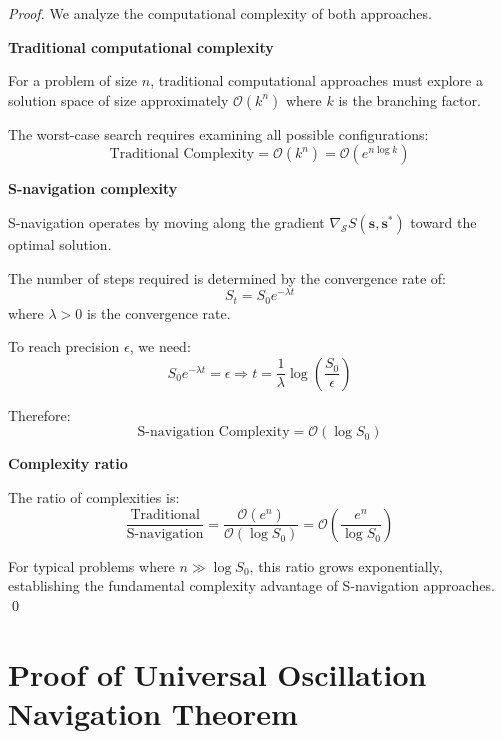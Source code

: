 \documentclass[12pt,a4paper]{article}
\begin{document}
\begin{proof}
We analyze the computational complexity of both approaches.

\textbf{Traditional computational complexity}

For a problem of size $n$, traditional computational approaches must explore a solution space of size approximately $\mathcal{O}(k^n)$ where $k$ is the branching factor.

The worst-case search requires examining all possible configurations:
\begin{equation}
\text{Traditional Complexity} = \mathcal{O}(k^n) = \mathcal{O}(e^{n \log k})
\end{equation}

\textbf{S-navigation complexity}

S-navigation operates by moving along the gradient $\nabla_{\mathcal{S}} S(\mathbf{s}, \mathbf{s}^*)$ toward the optimal solution.

The number of steps required is determined by the convergence rate of:
\begin{equation}
S_t = S_0 e^{-\lambda t}
\end{equation}
where $\lambda > 0$ is the convergence rate.

To reach precision $\epsilon$, we need:
\begin{equation}
S_0 e^{-\lambda t} = \epsilon \Rightarrow t = \frac{1}{\lambda} \log\left(\frac{S_0}{\epsilon}\right)
\end{equation}

Therefore:
\begin{equation}
\text{S-navigation Complexity} = \mathcal{O}(\log S_0)
\end{equation}

\textbf{Complexity ratio}

The ratio of complexities is:
\begin{equation}
\frac{\text{Traditional}}{\text{S-navigation}} = \frac{\mathcal{O}(e^n)}{\mathcal{O}(\log S_0)} = \mathcal{O}\left(\frac{e^n}{\log S_0}\right)
\end{equation}

For typical problems where $n \gg \log S_0$, this ratio grows exponentially, establishing the fundamental complexity advantage of S-navigation approaches. \qed
\end{proof}

\section{Proof of Universal Oscillation Navigation Theorem}
\label{proof:universal_oscillation}
\end{document}
